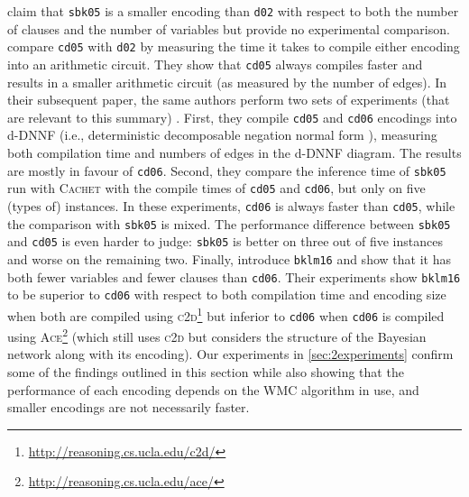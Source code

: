 \citet{DBLP:conf/aaai/SangBK05} claim that
\texttt{sbk05} is a smaller encoding than \texttt{d02} with respect to both the
number of clauses and the number of variables but provide no experimental
comparison. \citet{DBLP:conf/ijcai/ChaviraD05} compare \texttt{cd05} with
\texttt{d02} by measuring the time it takes to compile either encoding into an
arithmetic circuit. They show that
\texttt{cd05} always compiles faster and results in a smaller arithmetic circuit
(as measured by the number of edges). In their subsequent paper, the same
authors perform two sets of experiments (that are relevant to this summary)
\citep{DBLP:conf/sat/ChaviraD06}. First, they compile \texttt{cd05} and
\texttt{cd06} encodings into d-DNNF (i.e., deterministic decomposable negation
normal form \citep{DBLP:journals/jancl/Darwiche01}), measuring both compilation
time and numbers of edges in the d-DNNF diagram. The results are mostly in
favour of \texttt{cd06}. Second, they compare the inference time of
\texttt{sbk05} run with \textsc{Cachet} \citep{DBLP:conf/sat/SangBBKP04} with
the compile times of \texttt{cd05} and \texttt{cd06}, but only on five (types
of) instances. In these experiments, \texttt{cd06} is always faster than
\texttt{cd05}, while the comparison with \texttt{sbk05} is mixed.  The
performance difference between \texttt{sbk05} and \texttt{cd05} is even harder
to judge: \texttt{sbk05} is better on three out of five instances and worse on
the remaining two. Finally, \citet{DBLP:conf/ecai/BartKLM16} introduce
\texttt{bklm16} and show that it has both fewer variables and fewer clauses than
\texttt{cd06}. Their experiments show \texttt{bklm16} to be superior to
\texttt{cd06} with respect to both compilation time and encoding size when both
are compiled using
\textsc{c2d}\footnote{\url{http://reasoning.cs.ucla.edu/c2d/}}
\citep{DBLP:conf/ecai/Darwiche04} but inferior to \texttt{cd06} when
\texttt{cd06} is compiled using
\textsc{Ace}\footnote{\url{http://reasoning.cs.ucla.edu/ace/}} (which still uses
\textsc{c2d} but considers the structure of the Bayesian network along with its
encoding). Our experiments in \cref{sec:2experiments} confirm some of the
findings outlined in this section while also showing that the performance of
each encoding depends on the WMC algorithm in use, and smaller encodings are not
necessarily faster.

